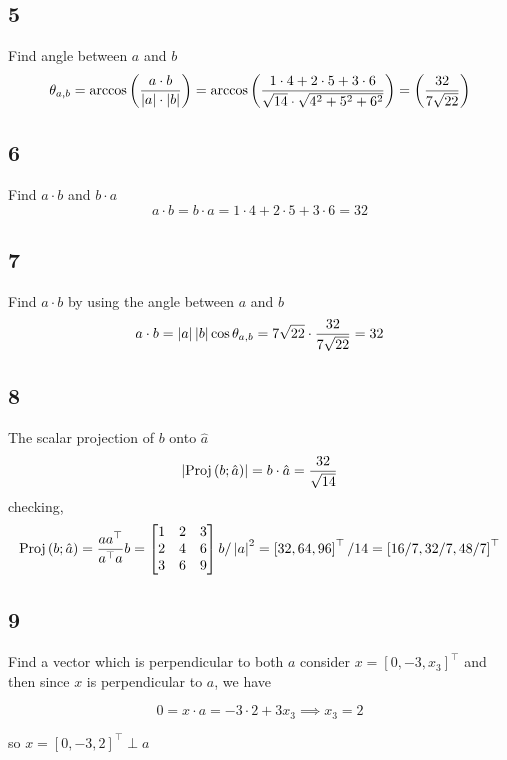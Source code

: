 \documentclass{article}
\begin{document}
\subsection*{5}
\begin{myleftlinebox}
    Find angle between \(a\) and \(b\)
    \tcblower
    \[
        \theta_{a,b} = \arccos\left( \frac{a\cdot b}{\left\vert a\right\vert\cdot\left\vert b\right\vert} \right)=\arccos\left( \frac{1\cdot 4+2\cdot 5+3\cdot 6}{\sqrt{14}\cdot \sqrt{4^2+5^2+6^2}} \right) = \left( \frac{32}{7\sqrt{22}} \right)
    \]
\end{myleftlinebox}


\subsection*{6}
\begin{myleftlinebox}
    Find \(a\cdot b\) and \(b\cdot a\)
    \tcblower
    \[
        a\cdot b = b\cdot a = 1\cdot 4+2\cdot 5+3\cdot 6 = 32
    \]
\end{myleftlinebox}


\subsection*{7}
\begin{myleftlinebox}
    Find \(a\cdot b\) by using the angle between \(a\) and \(b\)
    \tcblower
    \[
        a \cdot b = \left\vert a\right\vert\left\vert b\right\vert\cos \theta_{a,b} = 7\sqrt{22} \cdot \frac{32}{7\sqrt{22}} = 32
    \]
\end{myleftlinebox}


\subsection*{8}
\begin{myleftlinebox}
    The scalar projection of \(b\) onto \(\hat a\)
    \tcblower
    \[
        \left\vert\operatorname*{Proj}\left( b;\hat a \right)\right\vert = b\cdot \hat a = \frac{32}{\sqrt{14}}
    \]
    checking,
    \[
        \operatorname*{Proj}\left( b;\hat a \right) = \frac{a a^\top}{a^\top a}b = \begin{bmatrix}
            1 & 2 & 3\\
            2 & 4 & 6\\
            3 & 6 & 9
        \end{bmatrix}b/\left\vert a\right\vert^2 = \left[ 32,64,96 \right]^\top/14 = \left[ 16/7,32/7,48/7 \right]^\top
    \]
\end{myleftlinebox}



\subsection*{9}
\begin{myleftlinebox}
    Find a vector which is perpendicular to both \(a\)
    \tcblower
    consider \(x=[0,-3,x_3]^\top\) and then since \(x\) is perpendicular to \(a\), we have

    \[
        0 = x\cdot a = -3\cdot 2 + 3x_3\implies x_3 = 2
    \]

    so \(x =[0,-3,2]^\top\perp a\)
\end{myleftlinebox}
\end{document}
